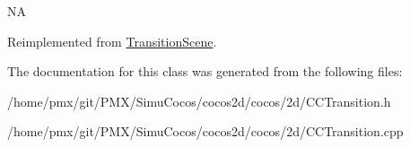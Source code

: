 NA 

Reimplemented from \hyperlink{classTransitionScene_aace390a1bd8f3c73bb650a1e256a0f83}{Transition\+Scene}.



The documentation for this class was generated from the following files\+:\begin{DoxyCompactItemize}
\item 
/home/pmx/git/\+P\+M\+X/\+Simu\+Cocos/cocos2d/cocos/2d/C\+C\+Transition.\+h\item 
/home/pmx/git/\+P\+M\+X/\+Simu\+Cocos/cocos2d/cocos/2d/C\+C\+Transition.\+cpp\end{DoxyCompactItemize}

